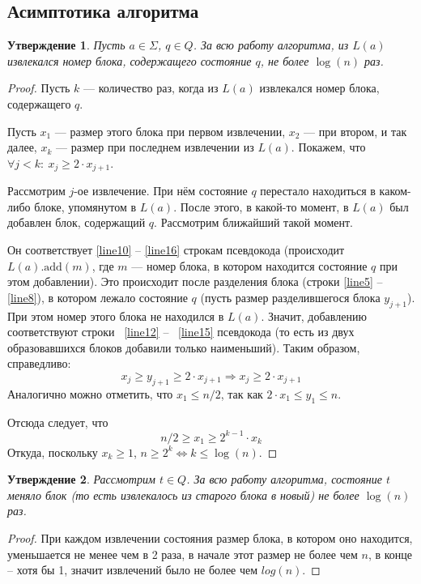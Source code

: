 \documentclass{article}
\newtheorem{statement}{Утверждение}
\begin{document}
\subsection{Асимптотика алгоритма}
\begin{statement}
  Пусть $a \in \Sigma$, $q \in Q$. За всю работу алгоритма, из $L(a)$ извлекался номер блока, содержащего состояние $q$, не более $\log(n)$ раз.   
\end{statement}
\begin{proof}
  Пусть $k$ --- количество раз, когда из $L(a)$ извлекался номер блока, содержащего $q$.

  Пусть $x_1$ --- размер этого блока при первом извлечении, $x_2$ --- при втором, и так далее, $x_k$ --- размер при последнем извлечении из $L(a)$. Покажем, что $\forall j < k: \ x_j \ge 2 \cdot x_{j+1}$.

  Рассмотрим $j$-ое извлечение. При нём состояние $q$ перестало находиться в каком-либо блоке, упомянутом в $L(a)$. После этого, в какой-то момент, в $L(a)$ был добавлен блок, содержащий $q$. Рассмотрим ближайший такой момент.

  Он соответствует \ref{line10} -- \ref{line16} строкам псевдокода (происходит $L(a).\text{add}(m)$, где $m$ --- номер блока, в котором находится состояние $q$ при этом добавлении). Это происходит после разделения блока (строки \ref{line5} -- \ref{line8}), в котором лежало состояние $q$ (пусть размер разделившегося блока $y_{j+1}$). При этом номер этого блока не находился в $L(a)$. Значит, добавлению соответствуют строки ~\ref{line12} -- ~\ref{line15} псевдокода (то есть из двух образовавшихся блоков добавили только наименьший). Таким образом, справедливо:
  \[x_j \ge y_{j+1} \ge 2 \cdot x_{j+1} \Rightarrow x_j \ge 2 \cdot x_{j+1}\]
  Аналогично можно отметить, что $x_1 \le n / 2$, так как $2 \cdot x_1 \le y_1 \le n$.

  Отсюда следует, что \[n/2 \ge x_1 \ge 2^{k-1} \cdot x_k\]
  Откуда, поскольку $x_k \ge 1$, $n \ge 2^k \Leftrightarrow k \le \log(n)$. 
\end{proof}
\begin{statement}
  Рассмотрим $t \in Q$. За всю работу алгоритма, состояние $t$ меняло блок (то есть извлекалось из старого блока в новый) не более $\log(n)$ раз.
\end{statement}
\begin{proof}
  При каждом извлечении состояния размер блока, в котором оно находится, уменьшается не менее чем в 2 раза, в начале этот размер не более чем $n$, в конце -- хотя бы 1, значит извлечений было не более чем $log(n)$.
\end{proof}
\end{document}
